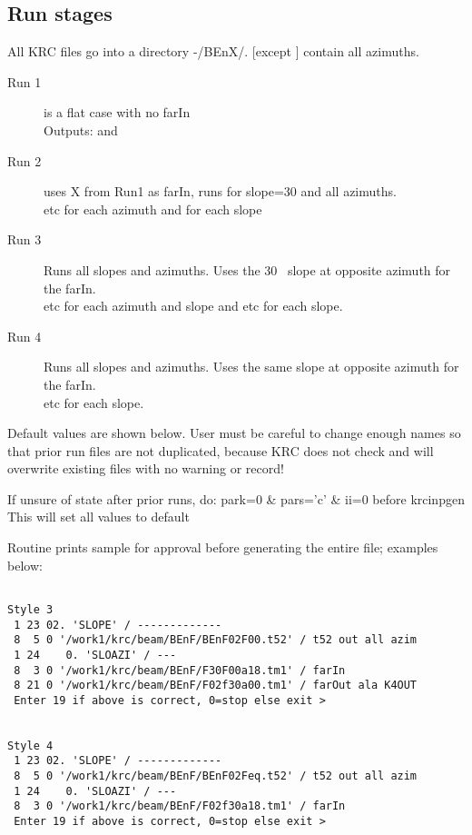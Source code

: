 \documentclass{article}
\begin{document}
\subsection{Run stages} %
All KRC files go into a directory -/BEnX/.   [except ] contain all azimuths.
\begin{description}  %
 \item [Run 1] is a flat case with no farIn
\\ Outputs:  and  
 \item [Run 2] uses X from Run1 as farIn, runs for slope=30 and all azimuths. \\   etc for each azimuth  and   for each slope

 \item [Run 3] Runs all slopes and azimuths. Uses the 30\qd~ slope at opposite
   azimuth for the farIn. 
\\  etc for each azimuth and slope and  etc for each slope.

 \item [Run 4] Runs all slopes and azimuths. Uses the same slope at opposite
   azimuth for the farIn. 
\\  etc for each slope.
 \end{description}

Default values are shown below. User must be careful to change enough names so
that prior run files are not duplicated, because KRC does not check and will
overwrite existing files with no warning or record!

If unsure of state after prior runs, do:
\qii park=0 \& pars='c' \& ii=0
\qi before krcinpgen
\\ This will set all values to default

Routine prints sample for approval before generating the entire file; examples below:

\vspace{-3.mm} 
\begin{verbatim}

Style 3
 1 23 02. 'SLOPE' / -------------
 8  5 0 '/work1/krc/beam/BEnF/BEnF02F00.t52' / t52 out all azim
 1 24    0. 'SLOAZI' / ---
 8  3 0 '/work1/krc/beam/BEnF/F30F00a18.tm1' / farIn
 8 21 0 '/work1/krc/beam/BEnF/F02f30a00.tm1' / farOut ala K4OUT
 Enter 19 if above is correct, 0=stop else exit > 


Style 4
 1 23 02. 'SLOPE' / -------------
 8  5 0 '/work1/krc/beam/BEnF/BEnF02Feq.t52' / t52 out all azim
 1 24    0. 'SLOAZI' / ---
 8  3 0 '/work1/krc/beam/BEnF/F02f30a18.tm1' / farIn
 Enter 19 if above is correct, 0=stop else exit > 
\end{verbatim}
\end{document}
